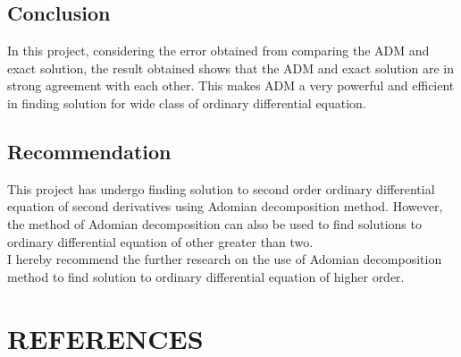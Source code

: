 \documentclass[11pt]{report}
\newcommand{\NI}{\noindent}
\begin{document}
	\section{Conclusion}
	In this project, considering the error obtained from comparing the ADM and exact solution, the result obtained shows that the ADM and exact solution are in strong agreement with each other. This makes ADM a very powerful and efficient in finding solution for wide class of ordinary differential equation.
	
	\section{Recommendation}
	This project has undergo finding solution to second order ordinary differential equation of second derivatives using Adomian decomposition method. However, the method of Adomian decomposition can also be used to find solutions to ordinary differential equation of other greater than two.\\
	
	\NI I hereby recommend the further research on the use of Adomian decomposition method to find solution to ordinary differential equation of higher order.

	
	\chapter*{REFERENCES}
	
\end{document}
